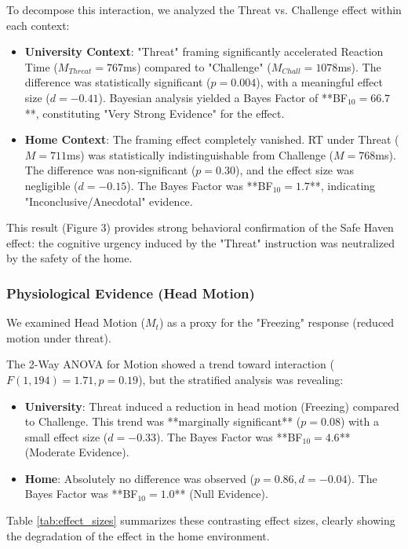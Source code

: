 To decompose this interaction, we analyzed the Threat vs. Challenge effect within each context:

\begin{itemize}
    \item \textbf{University Context}: "Threat" framing significantly accelerated Reaction Time ($M_{Threat}=767$ms) compared to "Challenge" ($M_{Chall}=1078$ms). The difference was statistically significant ($p = 0.004$), with a meaningful effect size ($d = -0.41$). Bayesian analysis yielded a Bayes Factor of **BF$_{10} = 66.7$**, constituting "Very Strong Evidence" for the effect.
    
    \item \textbf{Home Context}: The framing effect completely vanished. RT under Threat ($M=711$ms) was statistically indistinguishable from Challenge ($M=768$ms). The difference was non-significant ($p = 0.30$), and the effect size was negligible ($d = -0.15$). The Bayes Factor was **BF$_{10} = 1.7$**, indicating "Inconclusive/Anecdotal" evidence. 
\end{itemize}

This result (Figure 3) provides strong behavioral confirmation of the Safe Haven effect: the cognitive urgency induced by the "Threat" instruction was neutralized by the safety of the home.

\subsubsection{Physiological Evidence (Head Motion)}
We examined Head Motion ($M_t$) as a proxy for the "Freezing" response (reduced motion under threat).

The 2-Way ANOVA for Motion showed a trend toward interaction ($F(1,194)=1.71, p=0.19$), but the stratified analysis was revealing:
\begin{itemize}
    \item \textbf{University}: Threat induced a reduction in head motion (Freezing) compared to Challenge. This trend was **marginally significant** ($p = 0.08$) with a small effect size ($d = -0.33$). The Bayes Factor was **BF$_{10} = 4.6$** (Moderate Evidence).
    \item \textbf{Home}: Absolutely no difference was observed ($p = 0.86, d = -0.04$). The Bayes Factor was **BF$_{10} = 1.0$** (Null Evidence).
\end{itemize}

Table \ref{tab:effect_sizes} summarizes these contrasting effect sizes, clearly showing the degradation of the effect in the home environment.

